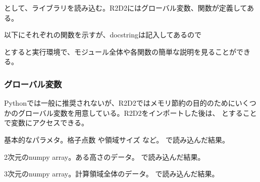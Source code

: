 \documentclass[letterpaper,10pt,dvipdfmx,report]{sphinxmanual}
\begin{document}
として、ライブラリを読み込む。R2D2にはグローバル変数、関数が定義してある。

以下にそれぞれの関数を示すが、docstringは記入してあるので

\begin{sphinxVerbatim}[commandchars=\\\{\}]
\end{sphinxVerbatim}

とすると実行環境で、モジュール全体や各関数の簡単な説明を見ることができる。


\subsubsection{グローバル変数}
\label{\detokenize{io:id4}}
Pythonでは一般に推奨されないが、R2D2ではメモリ節約の目的のためにいくつかのグローバル変数を用意している。R2D2をインポートした後は、 とすることで変数にアクセスできる。

\begin{fulllineitems}
\label{\detokenize{io:R2D2.R2D2.p}}
基本的なパラメタ。格子点数  や領域サイズ  など。  で読み込んだ結果。

\end{fulllineitems}


\begin{fulllineitems}
\label{\detokenize{io:R2D2.R2D2.q2}}
2次元のnumpy array。ある高さのデータ。 で読み込んだ結果。

\end{fulllineitems}


\begin{fulllineitems}
\label{\detokenize{io:R2D2.R2D2.q3}}
3次元のnumpy array。計算領域全体のデータ。 で読み込んだ結果。

\end{fulllineitems}
\end{document}
